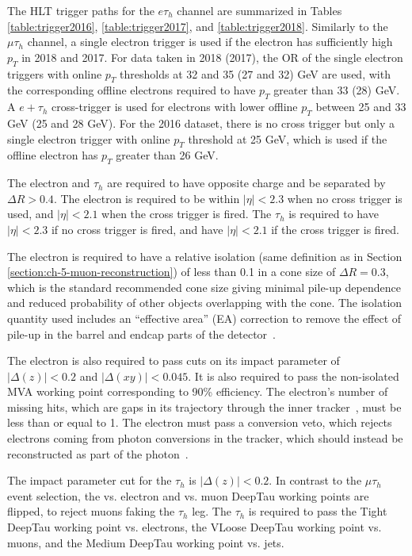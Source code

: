 The HLT trigger paths for the $e\tau_{h}$ channel are summarized in Tables \ref{table:trigger2016}, \ref{table:trigger2017}, and \ref{table:trigger2018}. Similarly to the $\mu\tau_{h}$ channel, a single electron trigger is used if the electron has sufficiently high $p_{T}$ in 2018 and 2017. For data taken in 2018 (2017), the OR of the single electron triggers with online $p_{T}$ thresholds at 32 and 35 (27 and 32) GeV are used, with the corresponding offline electrons required to have $p_{T}$ greater than 33 (28) GeV. A $e + \tau_{h}$ cross-trigger is used for electrons with lower offline $p_{T}$ between 25 and 33 GeV (25 and 28 GeV). For the 2016 dataset, there is no cross trigger but only a single electron trigger with online $p_{T}$ threshold at 25 GeV, which is used if the offline electron has $p_{T}$ greater than 26 GeV.

The electron and $\tau_h$ are required to have opposite charge and be separated by $\Delta R > 0.4$. The electron is required to be within $|\eta| < 2.3$ when no cross trigger is used, and $|\eta| < 2.1$ when the cross trigger is fired. The $\tau_{h}$ is required to have $|\eta| < 2.3$ if no cross trigger is fired, and have $|\eta| < 2.1$ if the cross trigger is fired.

The electron is required to have a relative isolation (same definition as in Section \ref{section:ch-5-muon-reconstruction}) of less than 0.1 in a cone size of $\Delta R = 0.3$, which is the standard recommended cone size giving minimal pile-up dependence and reduced probability of other objects overlapping with the cone. The isolation quantity used includes an ``effective area'' (EA) correction to remove the effect of pile-up in the barrel and endcap parts of the detector~\cite{twiki_EGamma_cutbased_ID_info}.

The electron is also required to pass cuts on its impact parameter of $|\Delta(z)| < 0.2$ and $|\Delta(xy)| < 0.045$. It is also required to pass the non-isolated MVA working point corresponding to 90\% efficiency. The electron's number of missing hits, which are gaps in its trajectory through the inner tracker~\cite{twiki_EGamma_cutbased_ID_info}, must be less than or equal to 1. The electron must pass a conversion veto, which rejects electrons coming from photon conversions in the tracker, which should instead be reconstructed as part of the photon~\cite{twiki_EGamma_cutbased_ID_info}.

The impact parameter cut for the $\tau_h$ is  $|\Delta(z)| < 0.2$. In contrast to the $\mu\tau_{h}$ event selection, the vs. electron and vs. muon DeepTau working points are flipped, to reject muons faking the $\tau_{h}$ leg. The $\tau_h$ is required to pass the Tight DeepTau working point vs. electrons, the VLoose DeepTau working point vs. muons, and the Medium DeepTau working point vs. jets.

